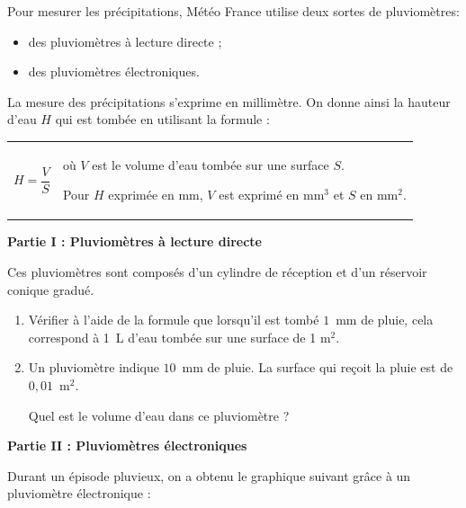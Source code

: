 
Pour mesurer les précipitations, Météo France utilise deux sortes
de pluviomètres:

\begin{itemize}
\item des pluviomètres à lecture directe ;
\item des pluviomètres électroniques.
 \end{itemize}
 
La mesure des précipitations s'exprime en millimètre. On donne ainsi la hauteur d'eau $H$
qui est tombée en utilisant la formule :
\begin{center}
\begin{tabularx}{\linewidth}{m{2.5cm}X }
$H = \dfrac{V}{S}$&
où $V$ est le volume d'eau tombée sur une surface $S$.

Pour $H$ exprimée en mm, $V$ est exprimé en mm$^3$ et $S$ en mm$^2$.
\end{tabularx}
\end{center}

\medskip

\textbf{Partie I : Pluviomètres à lecture directe}

\medskip

Ces pluviomètres sont composés d'un cylindre de réception et d'un réservoir conique
gradué.

\medskip

\begin{enumerate}
\item Vérifier à l'aide de la formule que lorsqu'il est tombé $1$~mm de pluie, cela correspond
à 1~L d'eau tombée sur une surface de 1 m$^2$.
\item Un pluviomètre indique $10$~mm de pluie. La surface qui reçoit la pluie est de $0,01$~m$^2$.

Quel est le volume d'eau dans ce pluviomètre ?
\end{enumerate}

\medskip

\textbf{Partie II : Pluviomètres électroniques}

\medskip

Durant un épisode pluvieux, on a obtenu le graphique suivant grâce à un pluviomètre
électronique :

